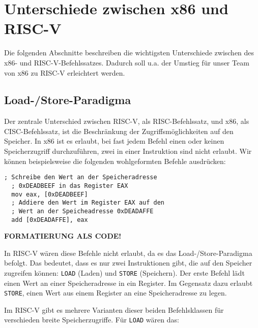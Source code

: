 \section{Unterschiede zwischen x86 und RISC-V}

Die folgenden Abschnitte beschreiben die wichtigsten Unterschiede zwischen des x86- und RISC-V-Befehlssatzes.
Dadurch soll u.a. der Umstieg für unser Team von x86 zu RISC-V erleichtert werden.

\subsection{Load-/Store-Paradigma}

Der zentrale Unterschied zwischen RISC-V, als RISC-Befehlssatz, und x86, als
CISC-Befehlssatz, ist die Beschränkung der
Zugriffsmöglichkeiten auf den Speicher. In x86 ist es erlaubt, bei fast
jedem Befehl einen oder keinen Speicherzugriff durchzuführen,
zwei in einer Instruktion sind nicht erlaubt.
Wir können beispielsweise
die folgenden wohlgeformten Befehle ausdrücken:

\begin{lstlisting}[style=x86Assembler]
  ; Schreibe den Wert an der Speicheradresse
  ; 0xDEADBEEF in das Register EAX
  mov eax, [0xDEADBEEF]
  ; Addiere den Wert im Register EAX auf den
  ; Wert an der Speicheadresse 0xDEADAFFE
  add [0xDEADAFFE], eax
\end{lstlisting}

\textbf{FORMATIERUNG ALS CODE!}

In RISC-V wären diese Befehle nicht erlaubt, da es das Load-/Store-Paradigma
befolgt. Das bedeutet, dass es nur zwei Instruktionen gibt, die auf den Speicher
zugreifen können: \lstinline[style=risc-v_Assembler]!LOAD! (Laden) und \lstinline[style=risc-v_Assembler]!STORE! (Speichern). Der erste
Befehl lädt einen Wert an einer Speicheradresse in ein Register. Im
Gegensatz dazu erlaubt \lstinline[style=risc-v_Assembler]!STORE!, einen Wert aus einem Register an eine
Speicheradresse zu legen.

Im RISC-V gibt es mehrere Varianten dieser beiden Befehlsklassen für
verschieden breite Speicherzugriffe. Für \lstinline[style=risc-v_Assembler]!LOAD! wären das:

